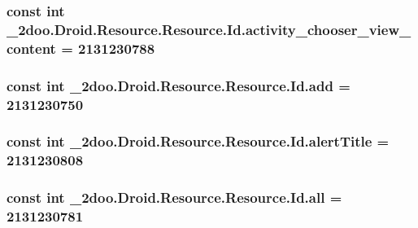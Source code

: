\hypertarget{class__2doo_1_1_droid_1_1_resource_1_1_id_7e81078c6e98b2006613c0c9322e3549}{
\subsubsection[{activity\_\-chooser\_\-view\_\-content}]{\setlength{\rightskip}{0pt plus 5cm}const int \_\-2doo.Droid.Resource.Resource.Id.activity\_\-chooser\_\-view\_\-content = 2131230788}}
\label{class__2doo_1_1_droid_1_1_resource_1_1_id_7e81078c6e98b2006613c0c9322e3549}


\hypertarget{class__2doo_1_1_droid_1_1_resource_1_1_id_f18bb2c55508b03848d50c2b13ea2cda}{
\subsubsection[{add}]{\setlength{\rightskip}{0pt plus 5cm}const int \_\-2doo.Droid.Resource.Resource.Id.add = 2131230750}}
\label{class__2doo_1_1_droid_1_1_resource_1_1_id_f18bb2c55508b03848d50c2b13ea2cda}


\hypertarget{class__2doo_1_1_droid_1_1_resource_1_1_id_ca5dca9b37618dfadea35051b9c6ef3d}{
\subsubsection[{alertTitle}]{\setlength{\rightskip}{0pt plus 5cm}const int \_\-2doo.Droid.Resource.Resource.Id.alertTitle = 2131230808}}
\label{class__2doo_1_1_droid_1_1_resource_1_1_id_ca5dca9b37618dfadea35051b9c6ef3d}


\hypertarget{class__2doo_1_1_droid_1_1_resource_1_1_id_b0d0dd099b92c977ded6e2dcd57c30d6}{
\subsubsection[{all}]{\setlength{\rightskip}{0pt plus 5cm}const int \_\-2doo.Droid.Resource.Resource.Id.all = 2131230781}}
\label{class__2doo_1_1_droid_1_1_resource_1_1_id_b0d0dd099b92c977ded6e2dcd57c30d6}


